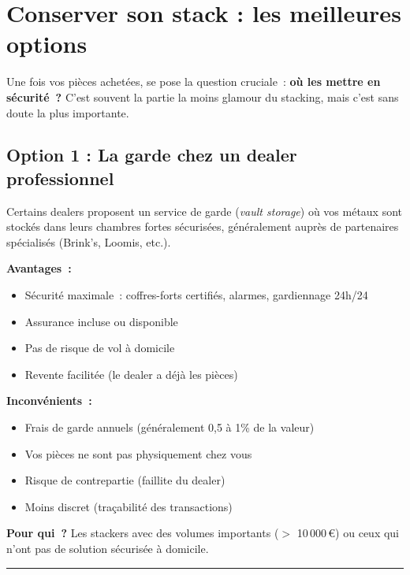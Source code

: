 \documentclass[14pt,a4paper]{extarticle}
\newcommand{\goldsep}{%
  \begin{center}
    \textcolor{gold}{\rule{6cm}{0.4pt}}
  \end{center}
}
\begin{document}
\newpage

\section*{Conserver son stack : les meilleures options}

Une fois vos pièces achetées, se pose la question cruciale~: \textbf{où les mettre en sécurité~?} C'est souvent la partie la moins glamour du stacking, mais c'est sans doute la plus importante.

\subsection*{Option 1 : La garde chez un dealer professionnel}

Certains dealers proposent un service de garde (\textit{vault storage}) où vos métaux sont stockés dans leurs chambres fortes sécurisées, généralement auprès de partenaires spécialisés (Brink's, Loomis, etc.).

\textbf{Avantages~:}
\begin{itemize}
  \item Sécurité maximale~: coffres-forts certifiés, alarmes, gardiennage 24h/24
  \item Assurance incluse ou disponible
  \item Pas de risque de vol à domicile
  \item Revente facilitée (le dealer a déjà les pièces)
\end{itemize}

\textbf{Inconvénients~:}
\begin{itemize}
  \item Frais de garde annuels (généralement 0,5 à 1\% de la valeur)
  \item Vos pièces ne sont pas physiquement chez vous
  \item Risque de contrepartie (faillite du dealer)
  \item Moins discret (traçabilité des transactions)
\end{itemize}

\textbf{Pour qui~?} Les stackers avec des volumes importants ($>$ 10\,000\,€) ou ceux qui n'ont pas de solution sécurisée à domicile.

\goldsep
\end{document}
